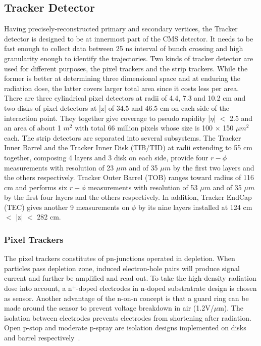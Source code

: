 \subsection{Tracker Detector} 
Having precisely-reconstructed primary and secondary vertices, the Tracker detector is designed to be at innermost part of the CMS detector.
It needs to be fast enough to collect data between 25 ns interval of bunch crossing and high granularity enough to identify the trajectories. 
Two kinds of tracker detector are used for different purposes, the pixel trackers and the strip trackers. 
While the former is better at determining three dimensional space and at enduring the radiation dose, 
the latter covers larger total area since it costs less per area. 
There are three cylindrical pixel detectors at radii of 4.4, 7.3 and 10.2 cm and two disks of pixel detectors at |z| of 34.5 and 46.5 cm on each side of the interaction point. 
They together give coverage to pseudo rapidity |$\eta $| $<$ 2.5 and an area of about 1 $m^2$ with total 66 million pixels whose size is 100 $\times$ 150 $\mu m^2$ each. 
The strip detectors are separated into several subsystems. The Tracker Inner Barrel and the Tracker Inner Disk (TIB/TID) at radii extending to 55 cm together, composing 4 layers and 3 disk on each side, 
provide four $r-\phi $ measurements with resolution of 23 $\mu m$ and of 35 $\mu m$ by the first two layers and the others respectively. 
Tracker Outer Barrel (TOB) ranges toward radius of 116 cm and performs six $r-\phi $ measurements with resolution of 53 $\mu m$ and of 35 $\mu m$ by the first four layers and the others respectively.
In addition, Tracker EndCap (TEC) gives another 9 measurements on $\phi $ by its nine layers installed at 124 cm $<$ |z| $<$ 282 cm.
 
\subsubsection{Pixel Trackers}
The pixel trackers constitutes of pn-junctions operated in depletion. 
When particles pass depletion zone, induced electron-hole pairs will produce signal current and further be amplified and read out. 
To take the high-density radiation dose into account, a n$^+$-doped electrodes in n-doped substratrate design is chosen as sensor. 
Another advantage of the n-on-n concept is that a guard ring can be made around the sensor to prevent voltage breakdown in air (1.2V/$\mu $m). 
The isolation between electrodes prevents electrodes from shortening after radiation. Open p-stop and moderate p-spray are isolation designs implemented on disks and barrel respectively~\citep{PixelD}.


